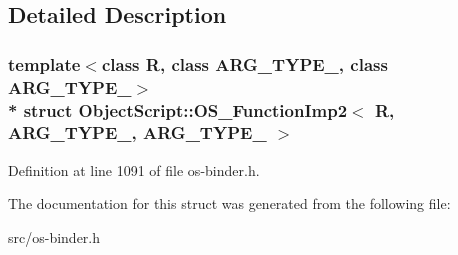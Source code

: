 \subsection{Detailed Description}
\subsubsection*{template$<$class R, class A\+R\+G\+\_\+\+T\+Y\+P\+E\+\_, class A\+R\+G\+\_\+\+T\+Y\+P\+E\+\_$>$\\*
struct Object\+Script\+::\+O\+S\+\_\+\+Function\+Imp2$<$ R, A\+R\+G\+\_\+\+T\+Y\+P\+E\+\_, A\+R\+G\+\_\+\+T\+Y\+P\+E\+\_ $>$}



Definition at line 1091 of file os-\/binder.\+h.



The documentation for this struct was generated from the following file\+:\begin{DoxyCompactItemize}
\item 
src/os-\/binder.\+h\end{DoxyCompactItemize}
